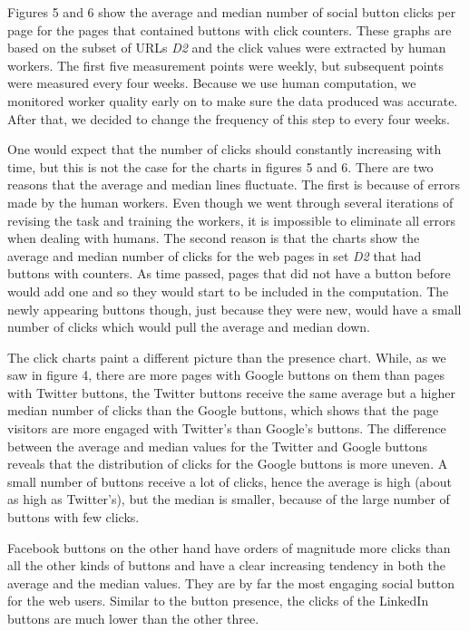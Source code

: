\documentclass{sig-alternate}
\begin{document}
Figures 5 and 6 show the average and median number of social button clicks per page for the pages that contained buttons with click counters. These graphs are based on the subset of URLs \emph{D2} and the click values were extracted by human workers. The first five measurement points were weekly, but subsequent points were measured every four weeks. Because we use human computation, we monitored worker quality early on to make sure the data produced was accurate. After that, we decided to change the frequency of this step to every four weeks.

One would expect that the number of clicks should constantly increasing with time, but this is not the case for the charts in figures 5 and 6. There are two reasons that the average and median lines fluctuate. The first is because of errors made by the human workers. Even though we went through several iterations of revising the task and training the workers, it is impossible to eliminate all errors when dealing with humans. The second reason is that the charts show the average and median number of clicks for the web pages in set \emph{D2} that had buttons with counters. As time passed, pages that did not have a button before would add one and so they would start to be included in the computation. The newly appearing buttons though, just because they were new, would have a small number of clicks which would pull the average and median down. 

The click charts paint a different picture than the presence chart. While, as we saw in figure 4, there are more pages with Google buttons on them than pages with Twitter buttons, the Twitter buttons receive the same average but a higher median number of clicks than the Google buttons, which shows that the page visitors are more engaged with Twitter's than Google's buttons. The difference between the average and median values for the Twitter and Google buttons reveals that the distribution of clicks for the Google buttons is more uneven. A small number of buttons receive a lot of clicks, hence the average is high (about as high as Twitter's), but the median is smaller, because of the large number of buttons with few clicks.

Facebook buttons on the other hand have orders of magnitude more clicks than all the other kinds of buttons and have a clear increasing tendency in both the average and the median values. They are by far the most engaging social button for the web users.
Similar to the button presence, the clicks of the LinkedIn buttons are much lower than the other three.
\end{document}
